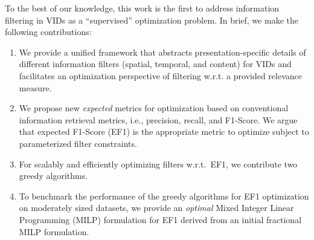 To the best of our knowledge, this work is the first to address information filtering in VIDs as a ``supervised'' optimization problem. In brief, we make the following contributions: 
\begin{enumerate}
\item We provide a unified framework that abstracts presentation-specific details of different information filters (spatial, temporal, and content) for VIDs and facilitates an optimization perspective of filtering w.r.t. a provided relevance measure.  
\item We propose new \emph{expected} metrics for optimization based on conventional information retrieval metrics, i.e., precision, recall, and F1-Score.  We argue that expected F1-Score (EF1) is the appropriate metric to optimize subject to parameterized filter constraints.
\item For scalably and efficiently optimizing filters w.r.t.\ EF1, we contribute two greedy algorithms.
\item To benchmark the performance of the greedy algorithms for EF1 optimization on moderately sized datasets, we provide an \emph{optimal} Mixed Integer Linear Programming (MILP) formulation for EF1 derived from an initial fractional MILP formulation.

\end{enumerate}
